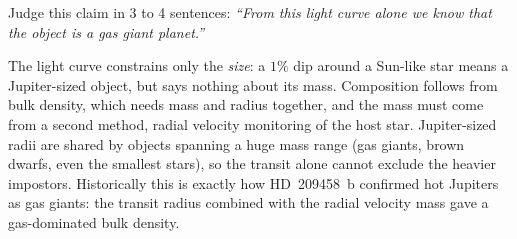 \parti {} Judge this claim in 3 to 4 sentences:
\emph{``From this light curve alone we know that the object is a gas giant planet.''}

\begin{solution}
The light curve constrains only the \emph{size}: a $1\%$ dip around a Sun-like star means a Jupiter-sized object, but says nothing about its mass.
Composition follows from bulk density, which needs mass and radius together, and the mass must come from a second method, radial velocity monitoring of the host star.
Jupiter-sized radii are shared by objects spanning a huge mass range (gas giants, brown dwarfs, even the smallest stars), so the transit alone cannot exclude the heavier impostors.
Historically this is exactly how HD~209458~b confirmed hot Jupiters as gas giants: the transit radius combined with the radial velocity mass gave a gas-dominated bulk density.
\end{solution}

